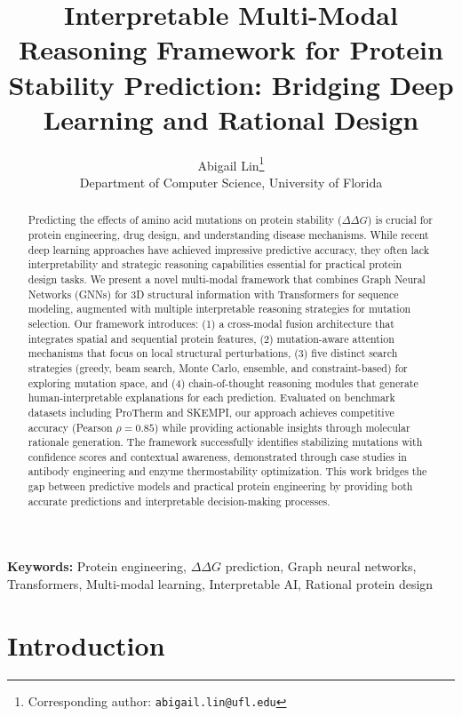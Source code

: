 \documentclass[11pt]{article}
\title{Interpretable Multi-Modal Reasoning Framework for Protein Stability
Prediction: Bridging Deep Learning and Rational Design}
\author{
  Abigail Lin\thanks{Corresponding author: \texttt{abigail.lin@ufl.edu}} \\
  \normalsize Department of Computer Science, University of Florida}
\date{}
\newcommand{\ddG}{\Delta\Delta G}
\begin{document}
\maketitle

\begin{abstract}

Predicting the effects of amino acid mutations on protein stability ($\ddG$) is
    crucial for protein engineering, drug design, and understanding disease
    mechanisms. While recent deep learning approaches have achieved impressive
    predictive accuracy, they often lack interpretability and strategic
    reasoning capabilities essential for practical protein design tasks. We
    present a novel multi-modal framework that combines Graph Neural Networks
    (GNNs) for 3D structural information with Transformers for sequence
    modeling, augmented with multiple interpretable reasoning strategies for
    mutation selection. Our framework introduces: (1) a cross-modal fusion
    architecture that integrates spatial and sequential protein features, (2)
    mutation-aware attention mechanisms that focus on local structural
    perturbations, (3) five distinct search strategies (greedy, beam search,
    Monte Carlo, ensemble, and constraint-based) for exploring mutation space,
    and (4) chain-of-thought reasoning modules that generate
    human-interpretable explanations for each prediction. Evaluated on
    benchmark datasets including ProTherm and SKEMPI, our approach achieves
    competitive accuracy (Pearson $\rho = 0.85$) while providing actionable
    insights through molecular rationale generation. The framework successfully
    identifies stabilizing mutations with confidence scores and contextual
    awareness, demonstrated through case studies in antibody engineering and
    enzyme thermostability optimization. This work bridges the gap between
    predictive models and practical protein engineering by providing both
    accurate predictions and interpretable decision-making processes.

\end{abstract}

\noindent\textbf{Keywords:} Protein engineering, $\ddG$ prediction, Graph neural networks, Transformers, Multi-modal learning, Interpretable AI, Rational protein design

\section{Introduction}
\end{document}
